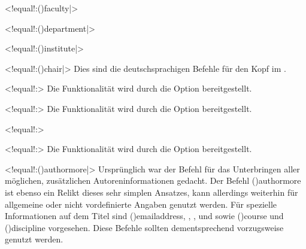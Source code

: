 \begin{DeclareEntity}{}
\begin{NoIndexDefault}
\begin{Declaration}
  {}
  <!equal!:\Macro(){faculty|}>
\begin{Declaration}
  {}
  <!equal!:\Macro(){department|}>
\begin{Declaration}
  {}
  <!equal!:\Macro(){institute|}>
\begin{Declaration}
  {}
  <!equal!:\Macro(){chair|}>
\printdeclarationlist
%
Dies sind die deutschsprachigen Befehle für den Kopf im \CD.
\end{Declaration}
\end{Declaration}
\end{Declaration}
\end{Declaration}

\begin{Declaration}
  {}
  <!equal!:>
\printdeclarationlist
%
Die Funktionalität wird durch die Option  bereitgestellt.
\end{Declaration}

\begin{Declaration}
  {}
  <!equal!:>
\printdeclarationlist
%
Die Funktionalität wird durch die Option  bereitgestellt.
\end{Declaration}

\begin{Declaration}
  {}
  <!equal!:>
\begin{Declaration}
  {}
  <!equal!:>
\printdeclarationlist
%
Die Funktionalität wird durch die Option  bereitgestellt.
\end{Declaration}
\end{Declaration}

\begin{Declaration}
  {}
  <!equal!:\Macro(){authormore|}>
\printdeclarationlist
%
Ursprünglich war der Befehl für das Unterbringen aller möglichen, zusätzlichen 
Autoreninformationen gedacht. Der Befehl \Macro(){authormore} 
ist ebenso ein Relikt dieses sehr simplen Ansatzes, kann allerdings weiterhin 
für allgemeine oder nicht vordefinierte Angaben genutzt werden. Für spezielle 
Informationen auf dem Titel sind \Macro(){emailaddress}, 
, ,  
und  sowie \Macro(){course} und 
\Macro(){discipline} vorgesehen. Diese Befehle sollten 
dementsprechend vorzugsweise genutzt werden.
\end{Declaration}


\end{NoIndexDefault}
\end{DeclareEntity}
